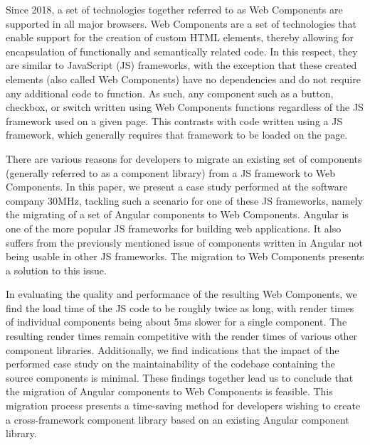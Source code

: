 Since 2018, a set of technologies together referred to as Web Components are supported in all major browsers. Web Components are a set of technologies that enable support for the creation of custom HTML elements, thereby allowing for encapsulation of functionally and semantically related code. In this respect, they are similar to JavaScript (JS) frameworks, with the exception that these created elements (also called Web Components) have no dependencies and do not require any additional code to function. As such, any component such as a button, checkbox, or switch written using Web Components functions regardless of the JS framework used on a given page. This contrasts with code written using a JS framework, which generally requires that framework to be loaded on the page.

There are various reasons for developers to migrate an existing set of components (generally referred to as a component library) from a JS framework to Web Components. In this paper, we present a case study performed at the software company 30MHz, tackling such a scenario for one of these JS frameworks, namely the migrating of a set of Angular components to Web Components. Angular is one of the more popular JS frameworks for building web applications. It also suffers from the previously mentioned issue of components written in Angular not being usable in other JS frameworks. The migration to Web Components presents a solution to this issue.

In evaluating the quality and performance of the resulting Web Components, we find the load time of the JS code to be roughly twice as long, with render times of individual components being about 5ms slower for a single component. The resulting render times remain competitive with the render times of various other component libraries. Additionally, we find indications that the impact of the performed case study on the maintainability of the codebase containing the source components is minimal. These findings together lead us to conclude that the migration of Angular components to Web Components is feasible. This migration process presents a time-saving method for developers wishing to create a cross-framework component library based on an existing Angular component library.